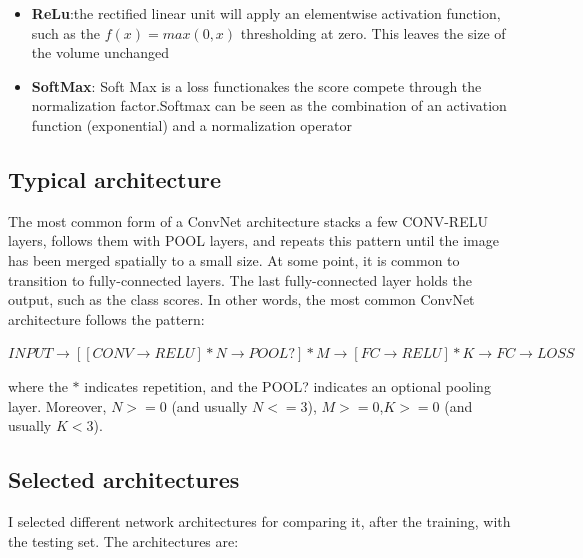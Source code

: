 \documentclass[]{report}
\begin{document}
\begin{itemize}
\item \textbf{ReLu}:the rectified linear unit will apply an elementwise activation function, such as the $ f(x) = max(0,x) $ thresholding at zero. This leaves the size of the volume unchanged 

\item \textbf{SoftMax}: Soft Max is a loss functionakes the score compete through the normalization
factor.Softmax can be seen as the combination of an activation function
(exponential) and a normalization operator

\end{itemize}


\subsection{Typical architecture}

The most common form of a ConvNet architecture stacks a few CONV-RELU layers, follows them with POOL layers, and repeats this pattern until the image has been merged spatially to a small size. At some point, it is common to transition to fully-connected layers. The last fully-connected layer holds the output, such as the class scores. In other words, the most common ConvNet architecture follows the pattern:

$INPUT\rightarrow [[CONV\rightarrow RELU]*N\rightarrow POOL?]*M\rightarrow[FC\rightarrow RELU]*K\rightarrow FC \rightarrow LOSS $

where the $ * $ indicates repetition, and the POOL? indicates an optional pooling layer. Moreover, $ N>=0 $ (and usually $ N<=3 $), $M >= 0$,$ K >= 0$ (and usually $ K < 3$).

\subsection{Selected architectures}

I selected different network architectures for comparing it, after the training, with the testing set. The architectures are:
\end{document}
